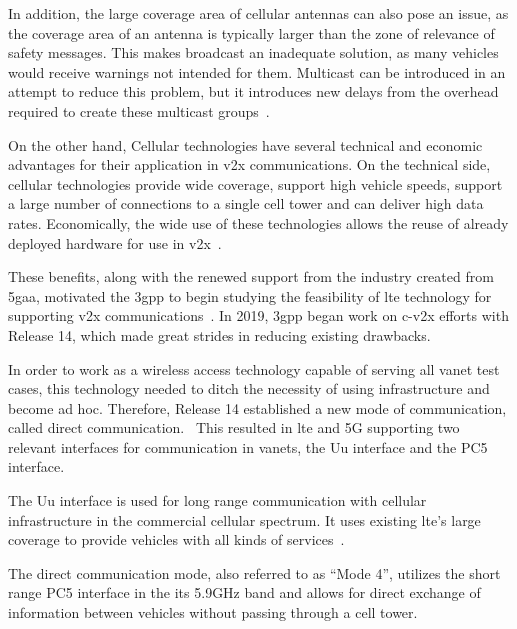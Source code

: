 In addition, the large coverage area of cellular antennas can also pose an issue, as the coverage area of an antenna is typically larger than the zone of relevance of safety messages. This makes broadcast an inadequate solution, as many vehicles would receive warnings not intended for them. Multicast can be introduced in an attempt to reduce this problem, but it introduces new delays from the overhead required to create these multicast groups~\cite{gyawali_challenges_2021}.

On the other hand, Cellular technologies have several technical and economic advantages for their application in \gls{v2x} communications. On the technical side, cellular technologies provide wide coverage, support high vehicle speeds, support a large number of connections to a single cell tower and can deliver high data rates. Economically, the wide use of these technologies allows the reuse of already deployed hardware for use in \gls{v2x}~\cite{gyawali_challenges_2021}.

These benefits, along with the renewed support from the industry created from \gls{5gaa}, motivated the \gls{3gpp} to begin studying the feasibility of \gls{lte} technology for supporting \gls{v2x} communications~\cite{gyawali_challenges_2021}. In 2019, \gls{3gpp} began work on \gls{c-v2x} efforts with Release 14, which made great strides in reducing existing drawbacks.

In order to work as a wireless access technology capable of serving all \gls{vanet} test cases, this technology needed to ditch the necessity of using infrastructure and become ad hoc. Therefore, Release 14 established a new mode of communication, called direct communication.~\cite{weber_c-v2x_2019} This resulted in \gls{lte} and 5G supporting two relevant interfaces for communication in \glspl{vanet}, the Uu interface and the PC5 interface.

The Uu interface is used for long range communication with cellular infrastructure in the commercial cellular spectrum. It uses existing \gls{lte}'s large coverage to provide vehicles with all kinds of services~\cite{weber_c-v2x_2019}.

The direct communication mode, also referred to as “Mode 4”, utilizes the short range PC5 interface in the \gls{its} 5.9GHz band and allows for direct exchange of information between vehicles without passing through a cell tower.


